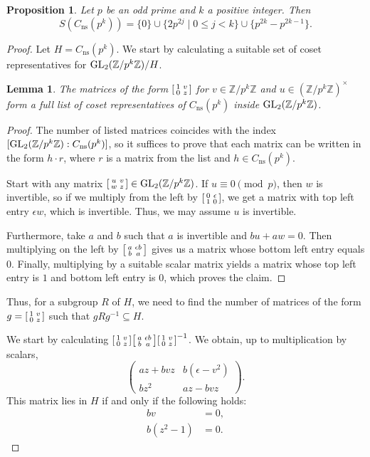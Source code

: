 \documentclass[10pt,leqno]{amsart}
\newcommand\sm[1]{\begin{bsmallmatrix}#1\end{bsmallmatrix}}
\newcommand{\Z}{\mathbb{Z}}
\newcommand{\GL}{\textnormal{GL}}
\newtheorem{lemma}[theorem]{Lemma}
\newtheorem{proposition}[theorem]{Proposition}
\theoremstyle{definition}
\theoremstyle{remark}
\numberwithin{theorem}{section}
\begin{document}
\begin{proposition}
    Let $p$ be an odd prime and $k$ a positive integer. Then $$S(C_{\mathrm{ns}}(p^k))=\{0\} \cup \{2p^{2j} \mid 0\leq j<k\} \cup \{p^{2k}-p^{2k-1} \}.$$
\end{proposition}
\begin{proof}
    Let $H=C_{\mathrm{ns}}(p^k)$. We start by calculating a suitable set of coset representatives for $\GL_2(\Z/p^k\Z)/H$. 
     \begin{lemma}
         The matrices of the form $\sm{1 & v \\ 0 & z}$ for $v\in \Z/p^k\Z$ and $u\in (\Z/p^k\Z)^\times$ form a full list of coset representatives of $C_{\mathrm{ns}}(p^k)$ inside $\GL_2(\Z/p^k\Z)$. 
     \end{lemma}
     \begin{proof}
         The number of listed matrices coincides with the index $[\GL_2(\Z/p^k\Z):C_{\mathrm{ns}}(p^k)]$, so it suffices to prove that each matrix can be written in the form $h\cdot r$, where $r$ is a matrix from the list and $h\in C_{\mathrm{ns}}(p^k)$. 

         Start with any matrix $\sm{u & v \\ w & z} \in \GL_2(\Z/p^k\Z)$. If $u\equiv 0 \pmod p$, then $w$ is invertible, so if we multiply from the left by $\sm{0 & \epsilon \\ 1 & 0}$, we get a matrix with top left entry $\epsilon w$, which is invertible. Thus, we may assume $u$ is invertible.

         Furthermore, take $a$ and $b$ such that $a$ is invertible and $bu+aw=0$. Then multiplying on the left by $\sm{a & \epsilon b \\ b & a}$ gives us a matrix whose bottom left entry equals $0$. Finally, multiplying by a suitable scalar matrix yields a matrix whose top left entry is $1$ and bottom left entry is $0$, which proves the claim. 
     \end{proof}
    Thus, for a subgroup $R$ of $H$, we need to find the number of matrices of the form $g=\sm{1 & v \\ 0 & z}$ such that $gRg^{-1}\subseteq H$. 
     
     We start by calculating $\sm{1 & v \\0 & z}\sm{a & \epsilon b \\ b & a}\sm{1 & v \\ 0 & z}^{-1}$. We obtain, up to multiplication by scalars, $$\begin{pmatrix} az+bvz & b(\epsilon - v^2) \\
bz^2 & az-bvz\end{pmatrix}.$$
This matrix lies in $H$ if and only if the following holds: \begin{align*}
bv &=0, \\
b(z^2-1)&=0.
\end{align*}


\end{proof}
\end{document}
